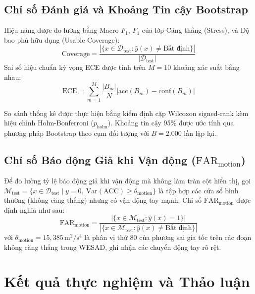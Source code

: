 \documentclass[conference]{IEEEtran}
\begin{document}
\subsection{Chỉ số Đánh giá và Khoảng Tin cậy Bootstrap}
Hiệu năng được đo lường bằng Macro $F_1$, $F_1$ của lớp Căng thẳng (Stress), và Độ bao phủ hữu dụng (Usable Coverage):
\begin{equation}
\text{Coverage} = \frac{|\{x \in \mathcal{D}_{\text{test}} : \hat{y}(x) \neq \text{Bất định}\}|}{|\mathcal{D}_{\text{test}}|}
\end{equation}
Sai số hiệu chuẩn kỳ vọng ECE được tính trên $M=10$ khoảng xác suất bằng nhau:
\begin{equation}
\text{ECE} = \sum_{m=1}^M \frac{|B_m|}{N} \left| \text{acc}(B_m) - \text{conf}(B_m) \right|
\end{equation}

So sánh thống kê được thực hiện bằng kiểm định cặp Wilcoxon signed-rank kèm hiệu chỉnh Holm-Bonferroni ($p_{\text{holm}}$). Khoảng tin cậy 95\% được ước tính qua phương pháp Bootstrap theo cụm đối tượng với $B=2.000$ lần lặp lại.

\subsection{Chỉ số Báo động Giả khi Vận động ($\text{FAR}_{\text{motion}}$)}
Để đo lường tỷ lệ báo động giả khi vận động mà không làm tràn cột hiển thị, gọi $\mathcal{M}_{\text{test}} = \{x \in \mathcal{D}_{\text{test}} \mid y=0, \ \text{Var}(\text{ACC}) \ge \theta_{\text{motion}}\}$ là tập hợp các cửa sổ bình thường (không căng thẳng) nhưng có vận động tay mạnh. Chỉ số $\text{FAR}_{\text{motion}}$ được định nghĩa như sau:
\begin{equation}
\text{FAR}_{\text{motion}} = \frac{|\{x \in \mathcal{M}_{\text{test}} : \hat{y}(x) = 1\}|}{|\{x \in \mathcal{M}_{\text{test}} : \hat{y}(x) \neq \text{Bất định}\}|}
\end{equation}
với $\theta_{\text{motion}} = 15,385$\,$\text{m}^2/\text{s}^4$ là phân vị thứ 80 của phương sai gia tốc trên các đoạn không căng thẳng trong WESAD, ghi nhận các chuyển động tay rõ rệt.

\section{Kết quả thực nghiệm và Thảo luận}
\end{document}
